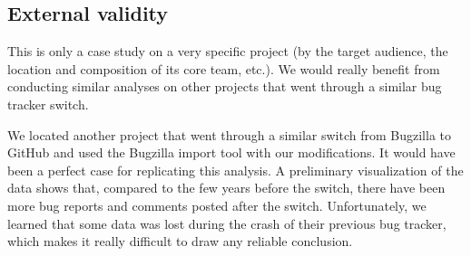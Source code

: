 \documentclass[conference]{IEEEtran}
\begin{document}



\subsection{External validity}

This is only a case study on a very specific project (by the target audience, the location and composition of its core team, etc.). We would really benefit from conducting similar analyses on other projects that went through a similar bug tracker switch.

We located another project that went through a similar switch from Bugzilla to GitHub and used the Bugzilla import tool with our modifications. It would have been a perfect case for replicating this analysis. A preliminary visualization of the data shows that, compared to the few years before the switch, there have been more bug reports and comments posted after the switch. Unfortunately, we learned that some data was lost during the crash of their previous bug tracker, which makes it really difficult to draw any reliable conclusion.
\end{document}
